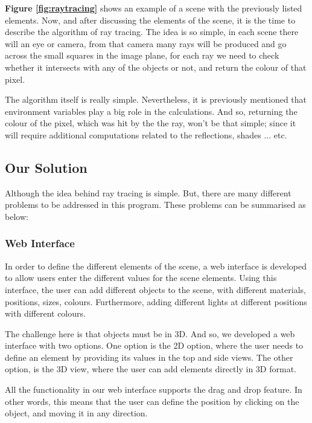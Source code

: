 \documentclass{article}
\begin{document}
	\par \textbf{Figure \ref{fig:raytracing}} shows an example of a scene with the previously listed elements. Now, and after discussing the elements of the scene, it is the time to describe the algorithm of ray tracing. The idea is so simple, in each scene there will an eye or camera, from that camera many rays will be produced and go across the small squares in the image plane, for each ray we need to check whether it intersects with any of the objects or not, and return the colour of that pixel.\\
	\par The algorithm itself is really simple. Nevertheless, it is previously mentioned that environment variables play a big role in the calculations. And so, returning the colour of the pixel, which was hit by the the ray, won't be that simple; since it will require additional computations related to the reflections, shades ... etc. 
	\subsection{Our Solution}
	Although the idea behind ray tracing is simple. But, there are many different problems to be addressed in this program. These problems can be summarised as below:
	\subsubsection{Web Interface}
	In order to define the different elements of the scene, a web interface is developed to allow users enter the different values for the scene elements. Using this interface, the user can add different objects to the scene, with different materials, positions, sizes, colours. Furthermore, adding different lights at different positions with different colours. \\
	\par The challenge here is that objects must be in 3D. And so, we developed a web interface with two options. One option is the 2D option, where the user needs to define an element by providing its values in the top and side views. The other option, is the 3D view, where the user can add elements directly in 3D format.\\
	\par All the functionality in our web interface supports the drag and drop feature. In other words, this means that the user can define the position by clicking on the object, and moving it in any direction.
\end{document}
